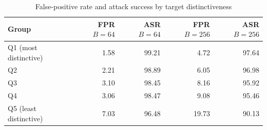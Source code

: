 \begin{table}[htbp]
\centering
\begin{tabular}{lrrrr}
\toprule
Group & FPR $B=64$ & ASR $B=64$ & FPR $B=256$ & ASR $B=256$ \\
\midrule
Q1 (most distinctive) & 1.58 & 99.21 & 4.72 & 97.64 \\
Q2 & 2.21 & 98.89 & 6.05 & 96.98 \\
Q3 & 3.10 & 98.45 & 8.16 & 95.92 \\
Q4 & 3.06 & 98.47 & 9.08 & 95.46 \\
Q5 (least distinctive) & 7.03 & 96.48 & 19.73 & 90.13 \\
\bottomrule
\end{tabular}
\caption{False-positive rate and attack success by target distinctiveness}
\label{tab:table7}
\end{table}
